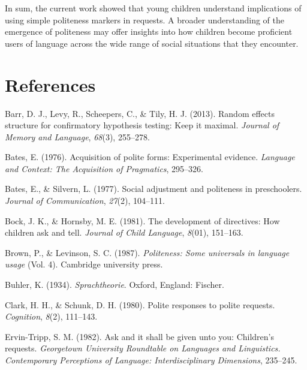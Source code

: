 \documentclass[10pt, letterpaper]{article}
\begin{document}
In sum, the current work showed that young children understand
implications of using simple politeness markers in requests. A broader
understanding of the emergence of politeness may offer insights into how
children become proficient users of language across the wide range of
social situations that they encounter.

\vspace{1em}
\vspace{1em} \noindent

\section{References}\label{references}

\setlength{\parindent}{-0.1in} \setlength{\leftskip}{0.125in} \noindent

\hypertarget{refs}{}
\hypertarget{ref-barr2013}{}
Barr, D. J., Levy, R., Scheepers, C., \& Tily, H. J. (2013). Random
effects structure for confirmatory hypothesis testing: Keep it maximal.
\emph{Journal of Memory and Language}, \emph{68}(3), 255--278.

\hypertarget{ref-bates1976}{}
Bates, E. (1976). Acquisition of polite forms: Experimental evidence.
\emph{Language and Context: The Acquisition of Pragmatics}, 295--326.

\hypertarget{ref-bates1977}{}
Bates, E., \& Silvern, L. (1977). Social adjustment and politeness in
preschoolers. \emph{Journal of Communication}, \emph{27}(2), 104--111.

\hypertarget{ref-bock1981}{}
Bock, J. K., \& Hornsby, M. E. (1981). The development of directives:
How children ask and tell. \emph{Journal of Child Language},
\emph{8}(01), 151--163.

\hypertarget{ref-brown1987}{}
Brown, P., \& Levinson, S. C. (1987). \emph{Politeness: Some universals
in language usage} (Vol. 4). Cambridge university press.

\hypertarget{ref-buhler1934}{}
Buhler, K. (1934). \emph{Sprachtheorie}. Oxford, England: Fischer.

\hypertarget{ref-clark1980}{}
Clark, H. H., \& Schunk, D. H. (1980). Polite responses to polite
requests. \emph{Cognition}, \emph{8}(2), 111--143.

\hypertarget{ref-ervin1982}{}
Ervin-Tripp, S. M. (1982). Ask and it shall be given unto you:
Children's requests. \emph{Georgetown University Roundtable on Languages
and Linguistics. Contemporary Perceptions of Language: Interdisciplinary
Dimensions}, 235--245.
\end{document}
